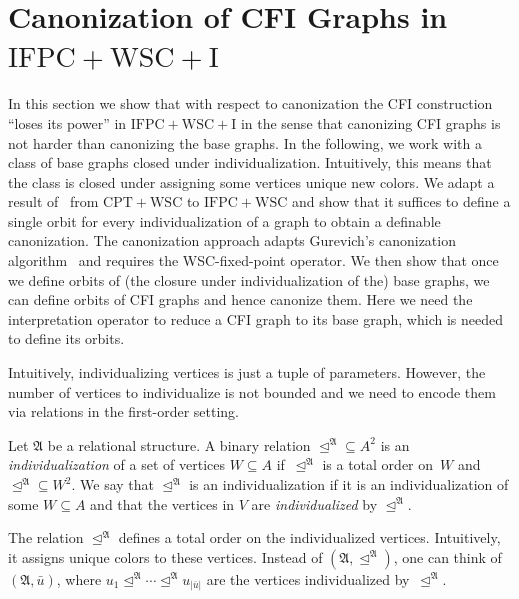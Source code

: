 \documentclass[]{lmcs}
\newcommand{\defining}[1]{\emph{#1}}
\newcommand{\tup}[1]{\bar{#1}}
\newcommand{\Struct}{\mathfrak{A}}
\newcommand{\StructV}{A}
\newcommand{\vertA}{u}
\newcommand{\StructA}{\mathfrak{A}}
\newcommand{\StructVA}{A}
\newcommand{\CPTWSC}{\ensuremath{\mathrm{CPT{+}WSC}}}
\newcommand{\IFPCWSC}{\ensuremath{\mathrm{IFPC{+}WSC}}}
\newcommand{\IFPCWSCI}{\ensuremath{\mathrm{IFPC{+}WSC{+}I}}}
\newcommand{\indRel}{\trianglelefteq}
\begin{document}
\section{Canonization of CFI Graphs in \IFPCWSCI{}}
\label{sec:canonize-cfi-graphs}

In this section we show that with respect to canonization
the CFI construction ``loses its power'' in \IFPCWSCI{}
in the sense that canonizing CFI graphs is not harder
than canonizing the base graphs.
In the following, we work with a class of base graphs closed under
individualization.
Intuitively, this means that the class is closed under assigning some
vertices unique new colors.
We adapt a result of~\cite{LichterSchweitzer24} from \CPTWSC{} to \IFPCWSC{}
and show that it suffices to define a single orbit
for every individualization of a graph
to obtain a definable canonization.
The canonization approach adapts Gurevich's canonization algorithm~\cite{Gurevich97} and requires the WSC-fixed-point operator.
We then show that once we define orbits of (the closure under individualization of the) base graphs,
we can define orbits of CFI graphs
and hence canonize them.
Here we need the interpretation operator to reduce a CFI graph to its base graph, which is needed to define its orbits.

Intuitively, individualizing vertices
is just a tuple of parameters.
However, the number of vertices to individualize is not bounded
and we need to encode them via relations in the first-order setting.

\begin{defi}
	Let $\Struct$ be a relational structure.
	A binary relation ${\indRel^\Struct} \subseteq \StructV^2$ 
	is an \defining{individualization} of a set of vertices $W \subseteq \StructVA$
	if~$\indRel^\StructA$ is a total order on~$W$
	and~${\indRel^\Struct} \subseteq W^2$.
	We say that $\indRel^\Struct$ is an individualization
	if it is an individualization of some $W \subseteq \StructVA$
	and that the vertices in $V$ are \defining{individualized} by $\indRel^\Struct$.
\end{defi}

The relation $\indRel^\Struct$ defines a total order on the individualized vertices.
Intuitively, it assigns unique colors to these vertices.
Instead of $(\Struct, \indRel^\Struct)$,
one can think of $(\Struct, \tup{\vertA})$,
where  $\vertA_1 \indRel^\StructA \cdots \indRel^\StructA \vertA_{|\tup{\vertA}|}$
are the vertices individualized by~$\indRel^\StructA$.
\end{document}
